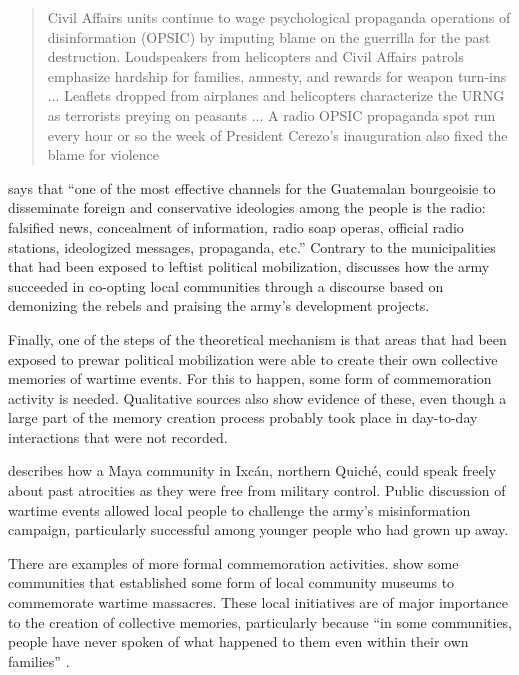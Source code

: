 \documentclass[12pt, notitlepage]{article}
\begin{document}
\begin{quote}
  Civil Affairs units continue to wage psychological propaganda operations of disinformation (OPSIC) by imputing blame on the guerrilla for the past destruction. Loudspeakers from helicopters and Civil Affairs patrols emphasize hardship for families, amnesty, and rewards for weapon turn-ins ... Leaflets dropped from airplanes and helicopters characterize the URNG as terrorists preying on peasants ... A radio OPSIC propaganda spot run every hour or so the week of President Cerezo's inauguration also fixed the blame for violence \citep[111]{Schirmer:1998wa}
\end{quote}

\citet[16]{Bran:1985tc} says that ``one of the most effective channels for the Guatemalan bourgeoisie to disseminate foreign and conservative ideologies among the people is the radio: falsified news, concealment of information, radio soap operas, official radio stations, ideologized messages, propaganda, etc.''
Contrary to the municipalities that had been exposed to leftist political mobilization, \citet{Esparza:2018uw} discusses how the army succeeded in co-opting local communities through a discourse based on demonizing the rebels and praising the army's development projects.


Finally, one of the steps of the theoretical mechanism is that areas that had been exposed to prewar political mobilization were able to create their own collective memories of wartime events.
For this to happen, some form of commemoration activity is needed.
Qualitative sources also show evidence of these, even though a large part of the memory creation process probably took place in day-to-day interactions that were not recorded.

\citet{Falla:2006vu} describes how a Maya community in Ixcán, northern Quiché, could speak freely about past atrocities as they were free from military control.
Public discussion of wartime events allowed local people to challenge the army's misinformation campaign, particularly successful among younger people who had grown up away.

There are examples of more formal commemoration activities.
\citet{Arriaza:2008wf} show some communities that established some form of local community museums to commemorate wartime massacres.
These local initiatives are of major importance to the creation of collective memories, particularly because ``in some communities, people have never spoken of what happened to them even within their own families'' \citep[161]{Arriaza:2008wf}.
\end{document}
